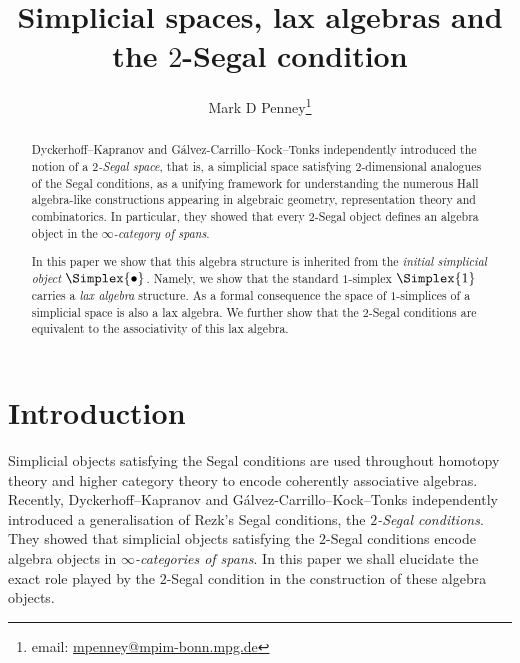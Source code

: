 \documentclass[a4paper]{article}
\title{Simplicial spaces, lax algebras and the $2$-Segal condition}
\author{Mark D Penney\footnote{ email: \href{mailto:mpenney@mpim-bonn.mpg.de}{mpenney@mpim-bonn.mpg.de}}}
\date{}
\numberwithin{equation}{section}
\begin{document}
 \maketitle
 \begin{abstract}
 Dyckerhoff--Kapranov \cite{DK12} and G\'alvez-Carrillo--Kock--Tonks \cite{KockI} independently introduced the notion of a {\em $2$-Segal space}, that is, a simplicial space satisfying $2$-dimensional analogues of the Segal conditions, as a unifying framework for understanding the numerous Hall algebra-like constructions appearing in algebraic geometry, representation theory and combinatorics. In particular, they showed that every $2$-Segal object defines an algebra object in the {\em $\infty$-category of spans}. 
 
 In this paper we show that this algebra structure is inherited from the {\em initial simplicial object} $\Simplex{\bullet}$. Namely, we show that the standard $1$-simplex $\Simplex{1}$ carries a {\em lax algebra} structure. As a formal consequence the space of $1$-simplices of a simplicial space is also a lax algebra. We further show that the $2$-Segal conditions are equivalent to the associativity of this lax algebra.
 \end{abstract}
 
 \tableofcontents
 


 
 \section{Introduction}
 \label{Intro}
 
  
  Simplicial objects satisfying the Segal conditions \cite{RezkCSS} are used throughout homotopy theory and higher category theory to encode coherently associative algebras. Recently, Dyckerhoff--Kapranov \cite{DK12} and G\'alvez-Carrillo--Kock--Tonks \cite{KockI} independently introduced a generalisation of Rezk's Segal conditions, the {\em $2$-Segal conditions}. They showed that simplicial objects satisfying the $2$-Segal conditions encode algebra objects in {\em $\infty$-categories of spans}. In this paper we shall elucidate the exact role played by the $2$-Segal condition in the construction of these algebra objects.
  
\end{document}
